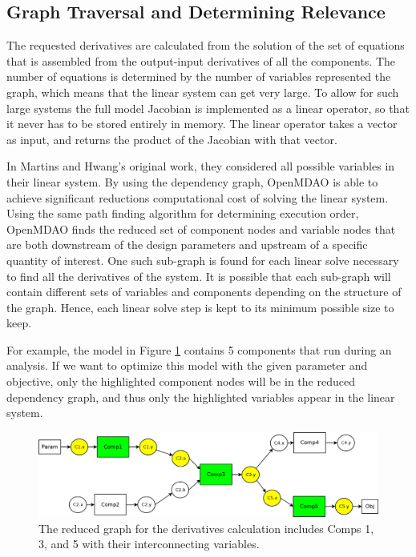 \documentclass[]{aiaa-tc} %
\begin{document}
    \subsection{Graph Traversal and Determining Relevance}

    
        The requested derivatives are calculated from the solution of the set of equations that is assembled
        from the output-input derivatives of all the components. The number of equations
        is determined by the number of variables represented the graph, which means that the linear
        system can get very large. To allow for such large systems the full model Jacobian is implemented as
        a linear operator, so that it never has to be stored entirely in memory. The
        linear operator takes a vector as input, and returns the product of the Jacobian with that vector.

        In Martins and Hwang's original work, they considered all possible variables in their linear system.
        By using the dependency graph, OpenMDAO is able to achieve significant reductions computational cost of
        solving the linear system. Using the same path finding algorithm for determining execution order,
        OpenMDAO finds the reduced set of component nodes and variable nodes that are both downstream of the design parameters
        and upstream of a specific quantity of interest. One such sub-graph is found for each linear solve necessary to
        find all the derivatives of the system. It is possible that each sub-graph will contain different sets
        of variables and components depending on the structure of the graph. Hence, each linear solve step
        is kept to its minimum possible size to keep.

        For example, the model in Figure \ref{fig:graph2} contains 5 components that run during an analysis. If we
        want to optimize this model with the given parameter and objective, only the highlighted component nodes
        will be in the reduced dependency graph, and thus only the highlighted variables appear in the linear
        system.

        \begin{figure}[!htb]\begin{center}
          \includegraphics[width=.8\textwidth]{images/Graph2}
          \caption{ The reduced graph for the derivatives calculation includes Comps 1, 3, and 5 with their interconnecting variables. \label{fig:graph2}}
        \end{center}\end{figure}
\end{document}
